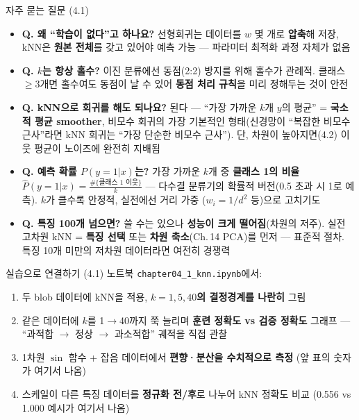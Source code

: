 \documentclass[aspectratio=169,11pt]{beamer}
\begin{document}
\begin{frame}{자주 묻는 질문 (4.1)}
  \small
  \begin{itemize}
    \item \textbf{Q. 왜 ``학습이 없다''고 하나요?}
      선형회귀는 데이터를 $w$ 몇 개로 \textbf{압축}해 저장,
      kNN은 \textbf{원본 전체}를 갖고 있어야 예측 가능 ---
      파라미터 최적화 과정 자체가 없음
    \item \textbf{Q. $k$는 항상 홀수?}
      이진 분류에선 동점(2:2) 방지를 위해 홀수가 관례적.
      클래스 $\geq 3$개면 홀수여도 동점이 날 수 있어
      \textbf{동점 처리 규칙}을 미리 정해두는 것이 안전
    \item \textbf{Q. kNN으로 회귀를 해도 되나요?}
      된다 --- ``가장 가까운 $k$개 $y$의 평균'' =
      \textbf{국소적 평균 smoother}, 비모수 회귀의 가장
      기본적인 형태(신경망이 ``복잡한 비모수 근사''라면
      kNN 회귀는 ``가장 단순한 비모수 근사'').
      단, 차원이 높아지면(4.2) 이웃 평균이 노이즈에
      완전히 지배됨
    \item \textbf{Q. 예측 확률 $P(y=1|x)$는?}
      가장 가까운 $k$개 중 \textbf{클래스 1의 비율}
      $\hat P(y=1|x) = \frac{\#\{\text{클래스 1 이웃}\}}{k}$
      --- 다수결 분류기의 확률적 버전(0.5 초과 시 1로 예측).
      $k$가 클수록 안정적, 실전에선 거리 가중
      ($w_i = 1/d^2$ 등)으로 고치기도
    \item \textbf{Q. 특징 100개 넘으면?}
      쓸 수는 있으나 \textbf{성능이 크게 떨어짐}(차원의 저주).
      실전 고차원 kNN = \textbf{특징 선택} 또는
      \textbf{차원 축소}(Ch.\,14 PCA)를 먼저 --- 표준적 절차.
      특징 10개 미만의 저차원 데이터라면 여전히 경쟁력
  \end{itemize}
\end{frame}

\begin{frame}{실습으로 연결하기 (4.1)}
  노트북 \texttt{chapter04\_1\_knn.ipynb}에서:
  \begin{enumerate}
    \item 두 blob 데이터에 kNN을 적용,
      \textbf{$k=1, 5, 40$의 결정경계를 나란히} 그림
    \item 같은 데이터에 $k$를 1$\to$40까지 쭉 늘리며
      \textbf{훈련 정확도 vs 검증 정확도} 그래프 ---
      ``과적합 $\to$ 정상 $\to$ 과소적합'' 궤적을 직접 관찰
    \item 1차원 $\sin$ 함수 + 잡음 데이터에서
      \textbf{편향·분산을 수치적으로 측정}
      (앞 표의 숫자가 여기서 나옴)
    \item 스케일이 다른 특징 데이터를
      \textbf{정규화 전/후}로 나누어 kNN 정확도 비교
      (0.556 vs 1.000 예시가 여기서 나옴)
  \end{enumerate}
\end{frame}
\end{document}
